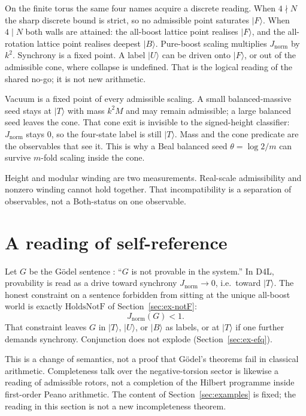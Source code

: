 \documentclass[a4paper]{article}
\theoremstyle{definition}
\newcommand{\Jnorm}{J_{\mathrm{norm}}}
\begin{document}
On the finite torus the same four names acquire a discrete reading.
When \(4\nmid N\) the sharp discrete bound is strict, so no admissible
point saturates \(\lvert F\rangle\). When \(4\mid N\) both walls are
attained: the all-boost lattice point realises \(\lvert F\rangle\), and
the all-rotation lattice point realises deepest \(\lvert B\rangle\). Pure-boost scaling multiplies \(\Jnorm\) by \(k^2\).
Synchrony is a fixed point. A label \(\lvert U\rangle\) can be driven
onto \(\lvert F\rangle\), or out of the admissible cone, where collapse
is undefined. That is the logical reading of the shared no-go; it is
not new arithmetic.

Vacuum is a fixed point of every admissible scaling. A small
balanced-massive seed stays at \(\lvert T\rangle\) with mass
\(k^2 M\) and may remain admissible; a large balanced seed leaves the
cone. That cone exit is invisible to the signed-height classifier:
\(\Jnorm\) stays \(0\), so the four-state label is still
\(\lvert T\rangle\). Mass and the cone predicate are the observables
that see it. This is why a Beal balanced seed \(\theta=\log 2/m\) can
survive \(m\)-fold scaling inside the cone.

Height and modular winding are two measurements. Real-scale
admissibility and nonzero winding cannot hold together. That
incompatibility is a separation of observables, not a Both-status on
one observable.

\section{A reading of self-reference}
\label{sec:godel}

Let \(G\) be the G\"odel sentence \cite{Godel1931}: ``\(G\) is not
provable in the system.'' In D4L, provability is read as a drive toward synchrony
\(\Jnorm\to 0\), i.e.\ toward \(\lvert T\rangle\). The honest constraint
on a sentence forbidden from sitting at the unique all-boost world is
exactly \(\mathrm{HoldsNotF}\) of Section~\ref{sec:ex-notF}:
\[
\Jnorm(G)<1.
\]
That constraint leaves \(G\) in \(\lvert T\rangle\), \(\lvert U\rangle\),
or \(\lvert B\rangle\) as labels, or at \(\lvert T\rangle\) if one
further demands synchrony. Conjunction does not explode
(Section~\ref{sec:ex-efq}).

This is a change of semantics, not a proof that G\"odel's theorems fail
in classical arithmetic. Completeness talk over the negative-torsion
sector is likewise a reading of admissible rotors, not a completion of
the Hilbert programme inside first-order Peano arithmetic. The content
of Section~\ref{sec:examples} is fixed; the reading in this section is
not a new incompleteness theorem.
\end{document}
